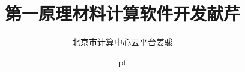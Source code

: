 \documentclass[cjk,slidestop,compress,mathserif,blue]{beamer}
\begin{document}

\renewcommand{\figurename}{\tiny{\bf Fig}.}
\renewcommand{\tablename}{\tiny{\bf Tab}.}
\renewcommand{\thesubfigure}{\tiny(\alph{subfigure})}  %

%

\title{第一原理材料计算软件开发献芹}

\author[]{北京市计算中心\;云平台\:姜骏}
\institute[BCC]{\inst{}%
}
\date[\today] %
{	%
 pt {\fontsize{8.2pt}{6.2pt}}
}
\end{document}
